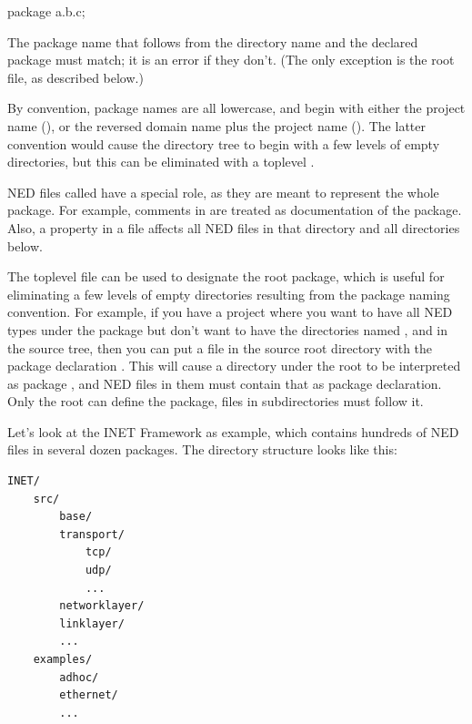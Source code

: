 \begin{ned}
package a.b.c;
\end{ned}

The package name that follows from the directory name and the declared
package must match; it is an error if they don't. (The only exception
is the root  file, as described below.)

By convention, package names are all lowercase, and begin with either
the project name (), or the reversed domain name plus the
project name (). The latter convention
would cause the directory tree to begin with a few levels of empty
directories, but this can be eliminated with a toplevel .

NED files called  have a special role, as they are meant
to represent the whole package. For example, comments in
 are treated as documentation of the package. Also, a
 property in a  file affects all NED
files in that directory and all directories below.

The toplevel  file can be used to designate the root
package, which is useful for eliminating a few levels of empty directories
resulting from the package naming convention. For example, if you have a
project where you want to have all NED types under the 
package but don't want to have the directories named ,  and
 in the source tree, then you can put a 
file in the source root directory with the package declaration
. This will cause a directory  under the
root to be interpreted as package , and NED
files in them must contain that as package declaration. Only the root
 can define the package,  files
in subdirectories must follow it.

Let's look at the INET Framework as example, which contains hundreds of NED
files in several dozen packages. The directory structure looks like this:

\begin{Verbatim}
INET/
    src/
        base/
        transport/
            tcp/
            udp/
            ...
        networklayer/
        linklayer/
        ...
    examples/
        adhoc/
        ethernet/
        ...
\end{Verbatim}

